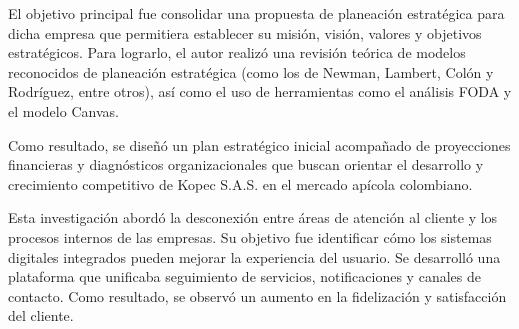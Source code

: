 El objetivo principal fue consolidar una propuesta de planeación estratégica para dicha empresa que permitiera establecer su misión, visión, valores y objetivos estratégicos. Para lograrlo, el autor realizó una revisión teórica de modelos reconocidos de planeación estratégica (como los de Newman, Lambert, Colón y Rodríguez, entre otros), así como el uso de herramientas como el análisis FODA y el modelo Canvas.

Como resultado, se diseñó un plan estratégico inicial acompañado de proyecciones financieras y diagnósticos organizacionales que buscan orientar el desarrollo y crecimiento competitivo de Kopec S.A.S. en el mercado apícola colombiano.

Esta investigación abordó la desconexión entre áreas de atención al cliente y los procesos internos de las empresas. Su objetivo fue identificar cómo los sistemas digitales integrados pueden mejorar la experiencia del usuario. Se desarrolló una plataforma que unificaba seguimiento de servicios, notificaciones y canales de contacto. Como resultado, se observó un aumento en la fidelización y satisfacción del cliente.

